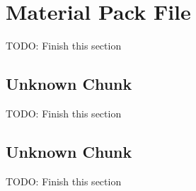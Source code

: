 \section{Material Pack File}
\label{sec:pfAMAT}

TODO: Finish this section

\subsection{Unknown Chunk}
\label{subsec:pfAMATchunkGRMT}

TODO: Finish this section

\subsection{Unknown Chunk}
\label{subsec:pfAMATchunkDX9S}

TODO: Finish this section



